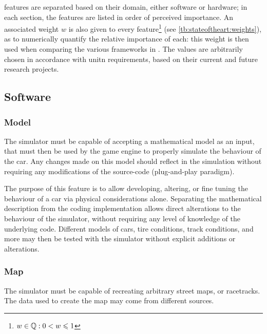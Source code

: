 \Glspl{feature} are separated based on their domain, either software or hardware; in each section, the \glspl{feature} are listed in order of perceived importance. An associated weight $w$ is also given to every \gls{feature}\footnote{$w \in \mathbb{Q}: 0 < w \leqslant 1$} (see \cref{tb:stateoftheart:weights}), as to numerically quantify the relative importance of each: this weight is then used when comparing the various \glspl{framework} in . The values are arbitrarily chosen in accordance with \gls{unitn} requirements, based on their current and future research projects.



\subsection{Software}

\subsubsection{Model}

The simulator must be capable of accepting a mathematical model as an input, that must then be used by the game engine to properly simulate the behaviour of the car. Any changes made on this model should reflect in the simulation without requiring any modifications of the source-code (plug-and-play paradigm).

The purpose of this \gls{feature} is to allow developing, altering, or fine tuning the behaviour of a car via physical considerations alone. Separating the mathematical description from the coding implementation allows direct alterations to the behaviour of the simulator, without requiring any level of knowledge of the underlying code. Different models of cars, tire conditions, track conditions, and more may then be tested with the simulator without explicit additions or alterations.

\subsubsection{Map}

The simulator must be capable of recreating arbitrary street maps, or racetracks. The data used to create the map may come from different sources.


